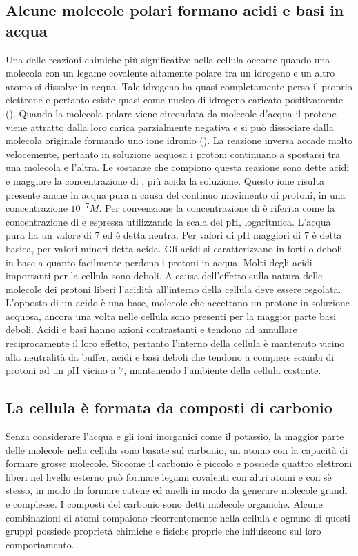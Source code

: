 \subsection{Alcune molecole polari formano acidi e basi in acqua}
Una delle reazioni chimiche pi\`u significative nella cellula occorre quando una molecola con un legame covalente altamente polare tra un idrogeno e un altro atomo si dissolve in acqua.
Tale idrogeno ha quasi completamente perso il proprio elettrone e pertanto esiste quasi come nucleo di idrogeno caricato positivamente (). Quando la molecola polare viene 
circondata da molecole d'acqua il protone viene attratto dalla loro carica parzialmente negativa e si pu\`o dissociare dalla molecola originale formando uno ione idronio (). La 
reazione inversa accade molto velocemente, pertanto in soluzione acquosa i protoni continuano a spostarsi tra una molecola e l'altra. Le sostanze che compiono questa reazione sono dette 
acidi e maggiore la concentrazione di , pi\`u acida la soluzione. Questo ione risulta presente anche in acqua pura a causa del continuo movimento di protoni, in una 
concentrazione $10^{-7} M$. Per convenzione la concentrazione di  \`e riferita come la concentrazione di  e espressa utilizzando la scala del pH, logaritmica. L'acqua 
pura ha un valore di $7$ ed \`e detta neutra. Per valori di pH maggiori di $7$ \`e detta basica, per valori minori detta acida. Gli acidi si caratterizzano in forti o deboli in base a 
quanto facilmente perdono i protoni in acqua. Molti degli acidi importanti per la cellula sono deboli. A causa dell'effetto sulla natura delle molecole dei protoni liberi l'acidit\`a 
all'interno della cellula deve essere regolata. L'opposto di un acido \`e una base, molecole che accettano un protone in soluzione acquosa, ancora una volta nelle cellula sono presenti 
per la maggior parte basi deboli. Acidi e basi hanno azioni contrastanti e tendono ad annullare reciprocamente il loro effetto, pertanto l'interno della cellula \`e mantenuto vicino 
alla neutralit\`a da buffer, acidi e basi deboli che tendono a compiere scambi di protoni ad un pH vicino a $7$, mantenendo l'ambiente della cellula costante. 
\subsection{La cellula \`e formata da composti di carbonio}
Senza considerare l'acqua e gli ioni inorganici come il potassio, la maggior parte delle molecole nella cellula sono basate sul carbonio, un atomo con la capacit\`a di formare grosse
molecole. Siccome il carbonio \`e piccolo e possiede quattro elettroni liberi nel livello esterno pu\`o formare legami covalenti con altri atomi e con s\`e stesso, in modo da formare
catene ed anelli in modo da generare molecole grandi e complesse. I composti del carbonio sono detti molecole organiche. Alcune combinazioni di atomi compaiono ricorrentemente nella
cellula e ognuno di questi gruppi possiede propriet\`a chimiche e fisiche proprie che influiscono sul loro comportamento. 
